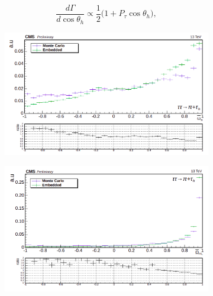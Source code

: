 \begin{equation}
    \frac{d\Gamma}{d\cos\theta_h}\propto\frac{1}{2}\bigl(1+P_{\tau}\cos\theta_h\bigr),
\end{equation}

\begin{figure}
    \begin{subfigure}[b]{0.5\linewidth}
    \centering
    \includegraphics[width=\linewidth]{Chapitre6/Images/OptVar/omegabar_pi_pitauh.png} 
    \caption*{} 
    \vspace{10mm}
  \end{subfigure}%
  \begin{subfigure}[b]{0.5\linewidth}
    \centering
    \includegraphics[width=\linewidth]{Chapitre6/Images/OptVar/Omegabar_pitauh.png} 
    \caption*{} 
    \vspace{10mm}
  \end{subfigure}
    \begin{subfigure}[b]{0.5\linewidth}

\end{subfigure}
\end{figure}
